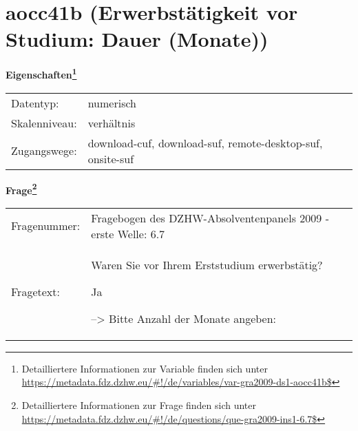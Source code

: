 
    \setcounter{footnote}{0}

    \vspace*{-1.8cm}
	\section{aocc41b (Erwerbstätigkeit vor Studium: Dauer (Monate))}
	\label{section:aocc41b}



    \vspace*{0.5cm}
    \noindent\textbf{Eigenschaften\footnote{Detailliertere Informationen zur Variable finden sich unter
		\url{https://metadata.fdz.dzhw.eu/\#!/de/variables/var-gra2009-ds1-aocc41b$}}}\\
	\begin{tabularx}{\hsize}{@{}lX}
	Datentyp: & numerisch \\
	Skalenniveau: & verhältnis \\
	Zugangswege: &
	  download-cuf, 
	  download-suf, 
	  remote-desktop-suf, 
	  onsite-suf
 \\
    \end{tabularx}



				\vspace*{0.5cm}
                \noindent\textbf{Frage\footnote{Detailliertere Informationen zur Frage finden sich unter
		              \url{https://metadata.fdz.dzhw.eu/\#!/de/questions/que-gra2009-ins1-6.7$}}}\\
				\begin{tabularx}{\hsize}{@{}lX}
					Fragenummer: &
					  Fragebogen des DZHW-Absolventenpanels 2009 - erste Welle:
					  6.7
 \\
					Fragetext: & Waren Sie vor Ihrem Erststudium erwerbstätig?\par  Ja\par  --\textgreater{} Bitte Anzahl der Monate angeben: \\
				\end{tabularx}





